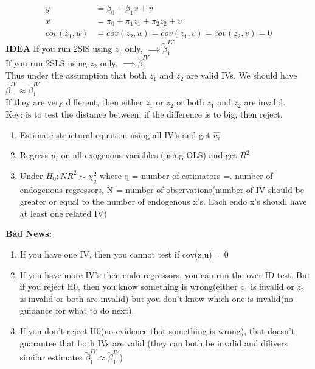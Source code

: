 \documentclass{article}
\theoremstyle{definition}
\theoremstyle{thrm}
\theoremstyle{lma}
\theoremstyle{ppst}
\theoremstyle{crlr}
\begin{document}
\begin{align*}
	y &= \beta_0+\beta_1x+v\\
	x &= \pi_0+\pi_1z_1+\pi_2z_2 +v\\
	cov(z_1,u) &= cov(z_2,u) = cov(z_1,v) = cov(z_2,v) = 0
\end{align*}
\textbf{IDEA}
If you run 2SlS using $z_1$ only, $\implies \tilde{\beta}_1^{IV}$\\
If you run 2SLS using $z_2$ only, $\implies \check{\beta}_1^{IV}$\\
Thus under the assumption that both $z_1$ and $z_2$ are valid IVs. We should have $\tilde{\beta}_1^{IV} \approx \check{\beta}_1^{IV}$\\
If they are very different, then either $z_1$ or $z_2$ or both $z_1$ and $z_2$ are invalid. \\
Key: is to test the distance between, if the difference is to big, then reject.
\begin{enumerate}
	\item Estimate structural equation using all IV's and get $\hat{u_i}$
	\item Regress $\hat{u_i}$ on all exogenous variables (using OLS) and get $R^2$
	\item Under $H_0: NR^2 \sim \chi_q^2$ where q = number of estimators  =. number of endogenous regressors, N = number of observations(number of IV should be greater or equal to the number of endogenous x's. Each endo x's shoudl have at least one related IV)
\end{enumerate}
\textbf{Bad News: }
\begin{enumerate}
	\item If you have one IV, then you cannot test if cov(z,u) = 0
	\item If you have more IV's then endo regressors, you can run the over-ID test. But if you reject H0, then you know something is wrong(either $z_1$ is invalid or $z_2$ is invalid or both are invalid) but you don't know which one is invalid(no guidance for what to do next).
	\item If you don't reject H0(no evidence that something is wrong), that doesn't guarantee that both IVs are valid (they can both be invalid and dilivers similar estimates $\tilde{\beta}_1^{IV} \approx \check{\beta}_1^{IV}$)
\end{enumerate}
\end{document}
